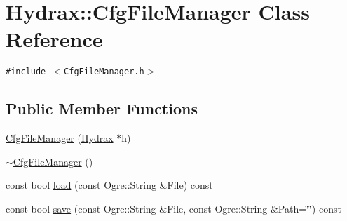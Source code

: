 \hypertarget{class_hydrax_1_1_cfg_file_manager}{
\section{Hydrax::CfgFileManager Class Reference}
\label{class_hydrax_1_1_cfg_file_manager}
}
{\tt \#include $<$CfgFileManager.h$>$}

\subsection*{Public Member Functions}
\begin{CompactItemize}
\item 
\hyperlink{class_hydrax_1_1_cfg_file_manager_c1d1c99b2a8f2fd4c5c58bf329755468}{CfgFileManager} (\hyperlink{class_hydrax_1_1_hydrax}{Hydrax} $\ast$h)
\item 
\hyperlink{class_hydrax_1_1_cfg_file_manager_e5567d446a52bf06a2e4e421066251d3}{$\sim$CfgFileManager} ()
\item 
const bool \hyperlink{class_hydrax_1_1_cfg_file_manager_7d283a6b6b61ad70292c7cb24cd3543c}{load} (const Ogre::String \&File) const 
\item 
const bool \hyperlink{class_hydrax_1_1_cfg_file_manager_5bdea43e50f5a1662e2dc80e68e0d8a6}{save} (const Ogre::String \&File, const Ogre::String \&Path=\char`\"{}\char`\"{}) const 
\end{CompactItemize}
